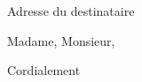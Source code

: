 \documentclass[a4paper, 11pt]{lettre}
\begin{document}
\begin{letter}{Adresse du destinataire}

\address{22}
\date{le \today}
\fax{}

\def\concname{Objet : }
\opening{Madame, Monsieur,}

\lipsum

\signature{Mon nom}

\closing{Cordialement}


\end{letter}
\end{document}
